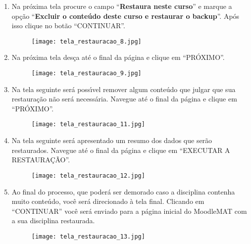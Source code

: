 \documentclass[12pt]{report}
\begin{document}
\begin{enumerate}[\bf 1)]
  	\newpage

	\item Na pr\'oxima tela procure o campo ``\textbf{Restaura neste curso}'' e marque a op\c{c}\~ao ``\textbf{Excluir o conte\'udo deste curso e restaurar o backup}''. Ap\'os isso clique no bot\~ao ``CONTINUAR''.
	\begin{figure}[H]
    	\centering
    	\hspace*{-2.5cm}\texttt{[image: tela\_restauracao\_8.jpg]}
  	\end{figure}

	\newpage

	\item Na pr\'oxima tela des\c{c}a at\'e o final da p\'agina e clique em ``PR\'OXIMO''.
	\begin{figure}[H]
    	\centering
    	\hspace*{-2.5cm}\texttt{[image: tela\_restauracao\_9.jpg]}
  	\end{figure}

  	\newpage

	\item Na tela seguinte ser\'a poss{\'\i}vel remover algum conte\'udo que julgar que sua restaura\c{c}\~ao n\~ao ser\'a necess\'aria. Navegue at\'e o final da p\'agina e clique em ``PR\'OXIMO''.
	\begin{figure}[H]
    	\centering
    	\hspace*{-2.5cm}\texttt{[image: tela\_restauracao\_11.jpg]}
  	\end{figure}

	\newpage

	\item Na tela seguinte ser\'a apresentado um resumo dos dados que ser\~ao restaurados. Navegue at\'e o final da p\'agina e clique em ``EXECUTAR A RESTAURA\c{C}\~AO''.
	\begin{figure}[H]
    	\centering
    	\hspace*{-2.5cm}\texttt{[image: tela\_restauracao\_12.jpg]}
  	\end{figure}

	\newpage

	\item Ao final do processo, que poder\'a ser demorado caso a disciplina contenha muito conte\'udo, voc\^e ser\'a direcionado \`a tela final. Clicando em ``CONTINUAR'' voc\^e ser\'a enviado para a p\'agina inicial do MoodleMAT com a sua disciplina restaurada.
	\begin{figure}[H]
    	\centering
    	\hspace*{-2.5cm}\texttt{[image: tela\_restauracao\_13.jpg]}
  	\end{figure}
\end{enumerate}
\end{document}

